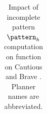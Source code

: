 \documentclass[11pt,landscape]{article}
\begin{document}
\begin{table}[tb]
{\begin{tabular}{|l||cccccccccc||cccccccccc||}
        \end{tabular}}
        \caption{Impact of incomplete pattern $\pattern_h$ computation on function on Cautious and Brave \pattyd. Planner names are abbreviated.}
        \label{tab:abl-patternh-incomplete}
        \end{table}
        
\end{document}
